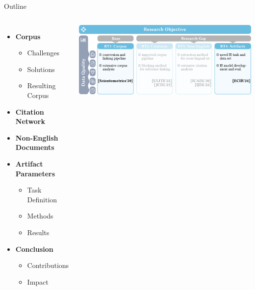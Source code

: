 \documentclass[en,16:9,smallfoot]{sdqbeamer}
\begin{document}
   \begin{frame}{Outline}
   \begin{columns}
           \begin{itemize}
               \item \textbf{Corpus}
               \begin{itemize}
                   \item Challenges
                   \item Solutions
                   \item Resulting Corpus
               \end{itemize}
               \item {\color{contextgrey}\textbf{Citation Network}}
               \item {\color{contextgrey}\textbf{Non-English Documents}}
               \item \textbf{Artifact Parameters}
               \begin{itemize}
                   \item Task Definition
                   \item Methods
                   \item Results
               \end{itemize}
               \item \textbf{Conclusion}
               \begin{itemize}
                   \item Contributions
                   \item Impact
               \end{itemize}
           \end{itemize}
            \includegraphics[width=\linewidth]{imgs/objective_grid_and_contrib_7}
   \end{columns}
   \end{frame}

\end{document}
